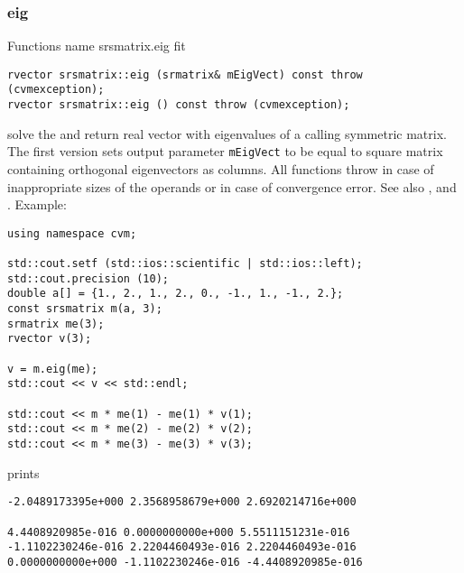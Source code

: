 \subsubsection{eig}
Functions%
\pdfdest name {srsmatrix.eig} fit
\begin{verbatim}
rvector srsmatrix::eig (srmatrix& mEigVect) const throw (cvmexception);
rvector srsmatrix::eig () const throw (cvmexception);
\end{verbatim}
solve the 
and return  real vector with eigenvalues
of a calling symmetric matrix.
The first version
sets  output parameter \verb"mEigVect" to be equal
to  square matrix containing orthogonal
eigenvectors as columns.
All  functions
throw 
in case of inappropriate sizes of the operands
or in case of convergence error.
See also
,
 and
.
Example:
\begin{Verbatim}
using namespace cvm;

std::cout.setf (std::ios::scientific | std::ios::left); 
std::cout.precision (10);
double a[] = {1., 2., 1., 2., 0., -1., 1., -1., 2.};
const srsmatrix m(a, 3);
srmatrix me(3);
rvector v(3);

v = m.eig(me);
std::cout << v << std::endl;

std::cout << m * me(1) - me(1) * v(1);
std::cout << m * me(2) - me(2) * v(2);
std::cout << m * me(3) - me(3) * v(3);
\end{Verbatim}
prints
\begin{Verbatim}
-2.0489173395e+000 2.3568958679e+000 2.6920214716e+000

4.4408920985e-016 0.0000000000e+000 5.5511151231e-016
-1.1102230246e-016 2.2204460493e-016 2.2204460493e-016
0.0000000000e+000 -1.1102230246e-016 -4.4408920985e-016
\end{Verbatim}
\newpage



